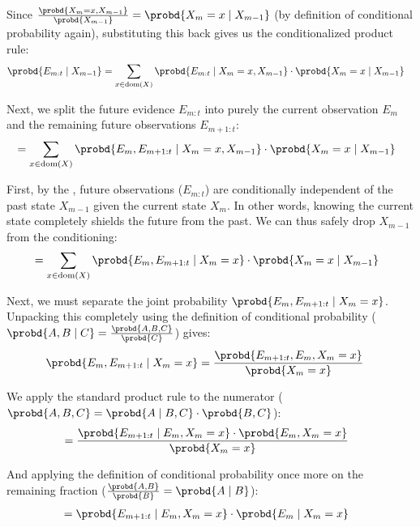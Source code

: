 Since $\frac{\probd{X_m = x, X_{m-1}}}{\probd{X_{m-1}}} = \probd{X_m = x \mid X_{m-1}}$ (by definition of conditional probability again), substituting this back gives us the conditionalized product rule:
\begin{align*}
\probd{E_{m:t} \mid X_{m-1}} &= \sum_{x \in \text{dom}(X)} \probd{E_{m:t} \mid X_m = x, X_{m-1}} \cdot \probd{X_m = x \mid X_{m-1}}
\end{align*}

Next, we split the future evidence $E_{m:t}$ into purely the current observation $E_m$ and the remaining future observations $E_{m+1:t}$:
\begin{align*}
&= \sum_{x \in \text{dom}(X)} \probd{E_m, E_{m+1:t} \mid X_m = x, X_{m-1}} \cdot \probd{X_m = x \mid X_{m-1}}
\end{align*}

First, by the , future observations ($E_{m:t}$) are conditionally independent of the past state $X_{m-1}$ given the current state $X_m$. In other words, knowing the current state completely shields the future from the past. We can thus safely drop $X_{m-1}$ from the conditioning:
\begin{align*}
&= \sum_{x \in \text{dom}(X)} \probd{E_m, E_{m+1:t} \mid X_m = x} \cdot \probd{X_m = x \mid X_{m-1}}
\end{align*}

Next, we must separate the joint probability $\probd{E_m, E_{m+1:t} \mid X_m = x}$. Unpacking this completely using the definition of conditional probability ($\probd{A, B \mid C} = \frac{\probd{A, B, C}}{\probd{C}}$) gives:
\begin{align*}
\probd{E_m, E_{m+1:t} \mid X_m = x} &= \frac{\probd{E_{m+1:t}, E_m, X_m = x}}{\probd{X_m = x}}
\end{align*}

We apply the standard product rule to the numerator ($\probd{A, B, C} = \probd{A \mid B, C} \cdot \probd{B, C}$):
\begin{align*}
&= \frac{\probd{E_{m+1:t} \mid E_m, X_m = x} \cdot \probd{E_m, X_m = x}}{\probd{X_m = x}}
\end{align*}

And applying the definition of conditional probability once more on the remaining fraction ($\frac{\probd{A, B}}{\probd{B}} = \probd{A \mid B}$):
\begin{align*}
&= \probd{E_{m+1:t} \mid E_m, X_m = x} \cdot \probd{E_m \mid X_m = x}
\end{align*}

